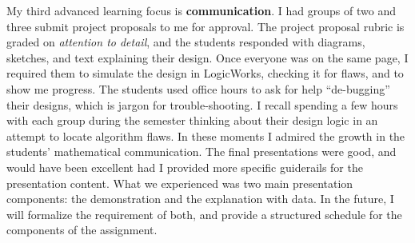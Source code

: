 \documentclass[../../../main.tex]{subfiles}
\begin{document}
My third advanced learning focus is \textbf{communication}.  I had groups of two and three submit project proposals to me for approval.  The project proposal rubric is graded on \textit{attention to detail}, and the students responded with diagrams, sketches, and text explaining their design.  Once everyone was on the same page, I required them to simulate the design in LogicWorks, checking it for flaws, and to show me progress.  The students used office hours to ask for help ``de-bugging'' their designs, which is jargon for trouble-shooting.  I recall spending a few hours with each group during the semester thinking about their design logic in an attempt to locate algorithm flaws.  In these moments I admired the growth in the students' mathematical communication.  The final presentations were good, and would have been excellent had I provided more specific guiderails for the presentation content.  What we experienced was two main presentation components: the demonstration and the explanation with data.  In the future, I will formalize the requirement of both, and provide a structured schedule for the components of the assignment. \\ \hspace{0.1cm}
\end{document}
